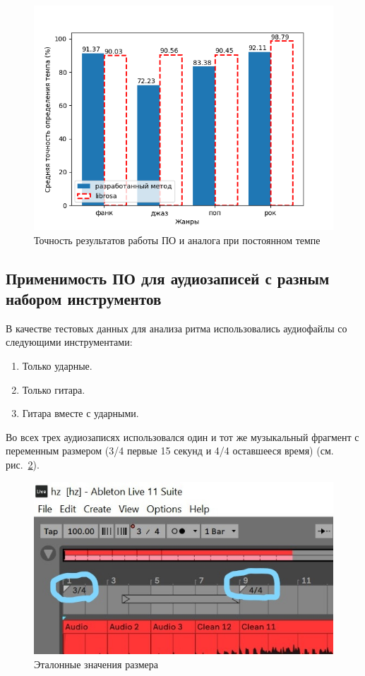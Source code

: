 \begin{figure}[h]
	\centering
	\includegraphics[scale=0.9]{../graphs/const_tempo_librosa.png}
	\caption{Точность результатов работы ПО и аналога при постоянном темпе}
	\label{img:tempo_librosa_const}
\end{figure}
\clearpage
\subsection{Применимость ПО для аудиозаписей с разным набором инструментов}

В качестве тестовых данных для анализа ритма использовались аудиофайлы со следующими инструментами:
 
\begin{enumerate}
	\item Только ударные.
	\item Только гитара.
	\item Гитара вместе с ударными.
\end{enumerate}

Во всех трех аудиозаписях использовался один и тот же музыкальный фрагмент с переменным размером (3/4 первые 15 секунд и 4/4 оставшееся время) (см. рис.~\ref{img:hz_ref}).

\begin{figure}[h]
	\centering
	\includegraphics[scale=0.7]{inc/img/hz_ref.jpg}
	\caption{Эталонные значения размера}
	\label{img:hz_ref}
\end{figure}

